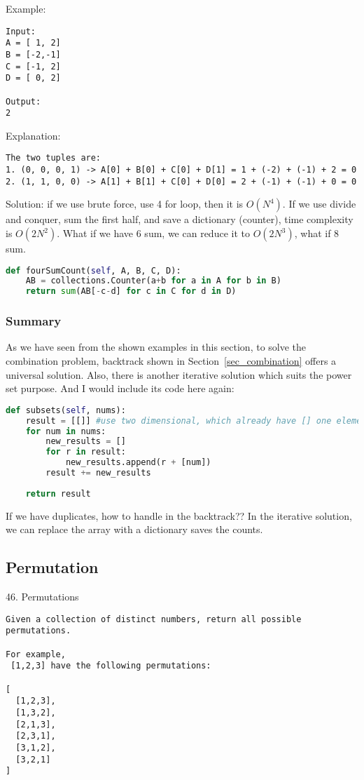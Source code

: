 \documentclass[../main.tex]{subfiles}
\begin{document}
Example:
\begin{lstlisting}
Input:
A = [ 1, 2]
B = [-2,-1]
C = [-1, 2]
D = [ 0, 2]

Output:
2
\end{lstlisting}

Explanation:

\begin{lstlisting}
The two tuples are:
1. (0, 0, 0, 1) -> A[0] + B[0] + C[0] + D[1] = 1 + (-2) + (-1) + 2 = 0
2. (1, 1, 0, 0) -> A[1] + B[1] + C[0] + D[0] = 2 + (-1) + (-1) + 0 = 0
\end{lstlisting}
Solution: if we use brute force, use 4 for loop, then it is $O(N^4)$. If we use divide and conquer, sum the first half, and save a dictionary (counter), time complexity is $O(2N^2)$. What if we have 6 sum, we can reduce it to $O(2N^3)$, what if 8 sum.

\begin{lstlisting}[language = Python]
def fourSumCount(self, A, B, C, D):
    AB = collections.Counter(a+b for a in A for b in B)
    return sum(AB[-c-d] for c in C for d in D)
\end{lstlisting}


\subsubsection{Summary}
As we have seen from the shown examples in this section, to solve the combination problem, backtrack shown in Section~\ref{sec_combination} offers a universal solution. Also, there is another iterative solution which suits the power set purpose. And I would include its code here again:
\begin{lstlisting}[language = Python]
def subsets(self, nums):
    result = [[]] #use two dimensional, which already have [] one element
    for num in nums:
        new_results = []
        for r in result:
            new_results.append(r + [num])
        result += new_results
        
    return result
\end{lstlisting}
If we have duplicates, how to handle in the backtrack?? In the iterative solution, we can replace the array with a dictionary saves the counts. 

\subsection{Permutation}
46. Permutations
\begin{lstlisting}
Given a collection of distinct numbers, return all possible permutations.

For example,
 [1,2,3] have the following permutations:

[
  [1,2,3],
  [1,3,2],
  [2,1,3],
  [2,3,1],
  [3,1,2],
  [3,2,1]
]
\end{lstlisting}
\end{document}
